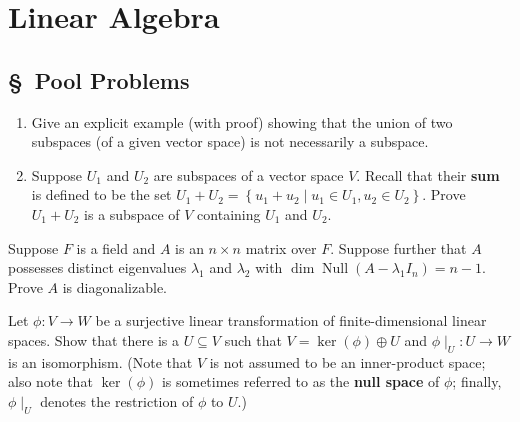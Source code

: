 \documentclass[11pt,twoside,openany]{memoir}
\begin{document}
\begin{abstract}
    This bank contains two types of problems: template problems and pool problems. \textbf{Template problems} are generally computational with easily adjustable specifics. These types of problems are especially prevalent in linear algebra. \textbf{Pool problems} include all problems that are not easily adjustable. These problems, when chosen, will usually be asked as is.
\end{abstract}

\begingroup
\let\clearpage\relax
\chapter*{Linear Algebra}
\section*{\S\ Pool Problems}
\endgroup
    \begin{exercise}
        \phantom{a}
        \begin{enumerate}[label = (\arabic*)]
            \item Give an explicit example (with proof) showing that the union of two subspaces (of a given vector space) is not necessarily a subspace.
            \item Suppose $U_1$ and $U_2$ are subspaces of a vector space $V$. Recall that their \textbf{sum} is defined to be the set $U_1+U_2 = \left\{ u_1 + u_2 \mid u_1 \in U_1, u_2 \in U_2 \right\}$. Prove $U_1 + U_2$ is a subspace of $V$ containing $U_1$ and $U_2$.
        \end{enumerate}
        \end{exercise}
        
        \begin{exercise}
        Suppose $F$ is a field and $A$ is an $n\times n$ matrix over $F$. Suppose further that $A$ possesses distinct eigenvalues $\lambda_1$ and $\lambda_2$ with $\dim \operatorname{Null}(A-\lambda_1 I_n)=n-1$. Prove $A$ is diagonalizable.
        \end{exercise}
        
        \begin{exercise}
        Let $\phi: V \to W$ be a surjective linear transformation of finite-dimensional linear spaces. Show that there is a $U \subseteq V$ such that $V = \ker(\phi) \oplus U$ and $\phi\mid_U : U \to W$ is an isomorphism. (Note that $V$ is not assumed to be an inner-product space; also note that $\ker(\phi)$ is sometimes referred to as the \textbf{null space} of $\phi$; finally, $\phi\mid_U$ denotes the restriction of $\phi$ to $U$.)
        \end{exercise}
        
\end{document}
